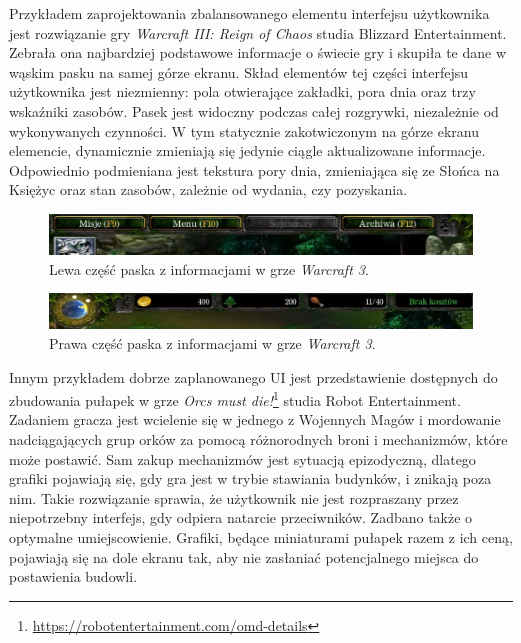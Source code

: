 Przykładem zaprojektowania zbalansowanego elementu interfejsu użytkownika jest rozwiązanie gry \textit{Warcraft III: Reign of Chaos} studia Blizzard Entertainment.
Zebrała ona najbardziej podstawowe informacje o świecie gry i skupiła te dane w wąskim pasku na samej górze ekranu.
Skład elementów tej części interfejsu użytkownika jest niezmienny: pola otwierające zakładki, pora dnia oraz trzy wskaźniki zasobów. Pasek jest widoczny
podczas całej rozgrywki, niezależnie od wykonywanych czynności. W tym statycznie zakotwiczonym na górze ekranu elemencie, dynamicznie
zmieniają się jedynie ciągle aktualizowane informacje. Odpowiednio podmieniana jest tekstura pory dnia, zmieniająca się ze Słońca
na Księżyc oraz stan zasobów, zależnie od wydania, czy pozyskania.

\begin{figure}[htbp]
    \centering
    \includegraphics[width=1.0\textwidth]{images/ui/warcraft3_gorny_pasek_lewy.png}
    \caption{Lewa część paska z informacjami w grze \textit{Warcraft 3}.}\label{fig:Warcraft3}
\end{figure}

\begin{figure}[htbp]
    \centering
    \includegraphics[width=1.0\textwidth]{images/ui/warcraft3_gorny_pasek_prawy.png}
    \caption[Prawa część paska z informacjami w grze \textit{Warcraft 3}.]{Prawa część paska z informacjami w grze \textit{Warcraft 3}\protect\footnotemark.}\label{fig:Warcraft3}
\end{figure}


Innym przykładem dobrze zaplanowanego UI jest przedstawienie dostępnych do zbudowania pułapek w grze
\textit{Orcs must die!}\footnote{\url{https://robotentertainment.com/omd-details}} studia Robot Entertainment. Zadaniem gracza jest wcielenie się w jednego z Wojennych Magów i mordowanie nadciągających grup orków za pomocą różnorodnych broni
i mechanizmów, które może postawić. Sam zakup mechanizmów jest sytuacją epizodyczną, dlatego grafiki pojawiają się, gdy gra jest w trybie stawiania budynków, 
i znikają poza nim. Takie rozwiązanie sprawia, że użytkownik nie jest rozpraszany przez niepotrzebny interfejs, gdy odpiera natarcie przeciwników. Zadbano także o
optymalne umiejscowienie. Grafiki, będące miniaturami pułapek razem z ich ceną, pojawiają się na dole ekranu tak, aby nie zasłaniać potencjalnego miejsca do postawienia budowli.

